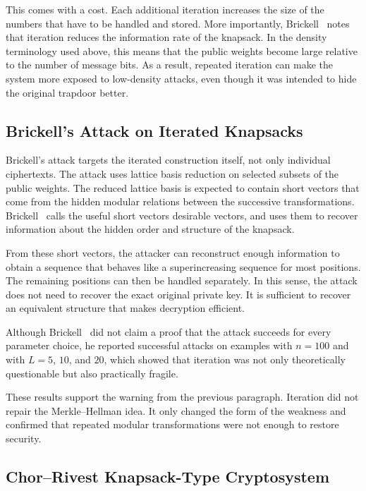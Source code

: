 This comes with a cost. Each additional iteration increases the size of the
numbers that have to be handled and stored. More importantly,
Brickell~\cite{Brickell1984} notes that iteration reduces the information rate
of the knapsack. In the density terminology used above, this means that the
public weights become large relative to the number of message bits. As a
result, repeated iteration can make the system more exposed to low-density
attacks, even though it was intended to hide the original trapdoor better.

\subsection{Brickell's Attack on Iterated Knapsacks}

Brickell's attack targets the iterated construction itself, not only individual
ciphertexts. The attack uses lattice basis reduction on selected subsets of the
public weights. The reduced lattice basis is expected to contain short vectors
that come from the hidden modular relations between the successive
transformations. Brickell~\cite[pp.~344--348]{Brickell1984} calls the useful short vectors desirable vectors, and
uses them to recover information about the hidden order and structure of the
knapsack.

From these short vectors, the attacker can reconstruct enough information to
obtain a sequence that behaves like a superincreasing sequence for most
positions. The remaining positions can then be handled separately. In this
sense, the attack does not need to recover the exact original private key. It
is sufficient to recover an equivalent structure that makes decryption
efficient.~\cite[pp.~349--355]{Brickell1984}

Although Brickell~\cite[pp.~343,356--357]{Brickell1984} did not claim a proof
that the attack succeeds for every parameter choice, he reported successful
attacks on examples with $n=100$ and with $L=5$, $10$, and $20$, which showed
that iteration was not only theoretically questionable but also practically
fragile. 

These results support the warning from the previous paragraph. Iteration did
not repair the Merkle--Hellman idea. It only changed the form of the weakness
and confirmed that repeated modular transformations were not enough to restore
security.

\subsection{Chor--Rivest Knapsack-Type Cryptosystem}

